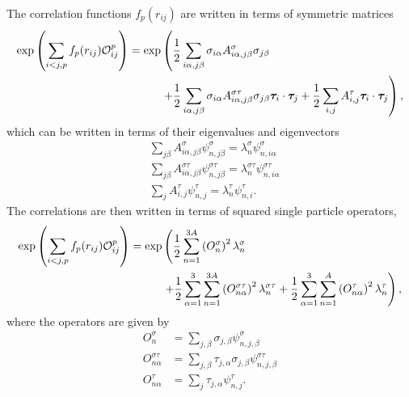 The correlation functions $f_p(r_{ij})$ are written in terms of symmetric matrices
\begin{equation}
\begin{split}
   \exp\left(\sum\limits_{i<j,p}f_p(r_{ij})\mathcal{O}^p_{ij}\right) = \exp&\left(\frac{1}{2}\sum\limits_{i\alpha,j\beta} \sigma_{i\alpha}A^{\sigma}_{i\alpha,j\beta}\sigma_{j\beta}\right. \\
      &\left. + \frac{1}{2}\sum\limits_{i\alpha,j\beta} \sigma_{i\alpha}A^{\sigma\tau}_{i\alpha,j\beta}\sigma_{j\beta}\bm{\tau}_i\cdot\bm{\tau}_j
      + \frac{1}{2}\sum\limits_{i,j} A^{\tau}_{i,j}\bm{\tau}_i\cdot\bm{\tau}_j\right),
   \label{equ:amatricies}
\end{split}
\end{equation}
which can be written in terms of their eigenvalues and eigenvectors
\begin{align}
   &\sum\limits_{j\beta} A^{\sigma}_{i\alpha,j\beta}\psi^{\sigma}_{n,j\beta} = \lambda^{\sigma}_n\psi^{\sigma}_{n,i\alpha} \\
   &\sum\limits_{j\beta} A^{\sigma\tau}_{i\alpha,j\beta}\psi^{\sigma\tau}_{n,j\beta} = \lambda^{\sigma\tau}_n\psi^{\sigma\tau}_{n,i\alpha} \\
   &\sum\limits_{j} A^{\tau}_{i,j}\psi^{\tau}_{n,j} = \lambda^{\tau}_n\psi^{\tau}_{n,i}.
\end{align}
The correlations are then written in terms of squared single particle operators,
\begin{equation}
\begin{split}
   \exp\left(\sum\limits_{i<j,p}f_p(r_{ij})\mathcal{O}^p_{ij}\right) = \exp&\left(\frac{1}{2}\sum\limits_{n=1}^{3A} \left(O_{n}^{\sigma}\right)^2 \lambda_n^{\sigma}\right. \\
      & \left. + \frac{1}{2}\sum\limits_{\alpha=1}^{3}\sum\limits_{n=1}^{3A} \left(O_{n\alpha}^{\sigma\tau}\right)^2 \lambda_n^{\sigma\tau}
      + \frac{1}{2}\sum\limits_{\alpha=1}^{3}\sum\limits_{n=1}^{A} \left(O_{n\alpha}^{\tau}\right)^2 \lambda_n^{\tau}\right),
\end{split}
\end{equation}
where the operators are given by
\begin{equation}
\begin{split}
   O_{n}^{\sigma} &= \sum\limits_{j,\beta} \sigma_{j,\beta}\psi_{n,j,\beta}^{\sigma} \\
   O_{n\alpha}^{\sigma\tau} &= \sum\limits_{j,\beta} \tau_{j,\alpha}\sigma_{j,\beta}\psi_{n,j,\beta}^{\sigma\tau} \\
   O_{n\alpha}^{\tau} &= \sum\limits_{j} \tau_{j,\alpha}\psi_{n,j}^{\tau}.
\end{split}
\end{equation}
